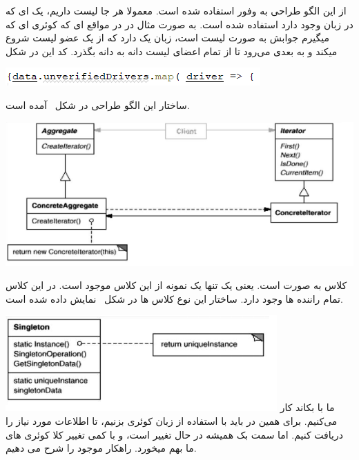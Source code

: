 

از این الگو طراحی به وفور استفاده شده است. معمولا هر جا لیست داریم، یک
 ای
 که در زبان وجود دارد استفاده شده است. به صورت مثال در
در مواقع ای که کوئری ای که میگیرم جوابش به صورت لیست است، زبان
یک 
 دارد که از یک عضو لیست شروع میکند و به بعدی می‌رود تا از تمام اعضای لیست دانه به دانه بگذرد. کد این
در شکل~

\centering
\includegraphics[width = 0.8 \linewidth]{../figs/patterns/iterator-code.png}

ساختار این الگو طراحی در  شکل~ آمده است.

\centering
\includegraphics[width = 0.8 \linewidth]{../figs/patterns/Iterator.png}

کلاس
به صورت
است. یعنی یک تنها یک نمونه از این کلاس موجود است. در این کلاس تمام راننده ها وجود دارد. ساختار این نوع کلاس ها در شکل~ نمایش داده شده است.

\centering
\includegraphics[width = 0.6 \linewidth]{../figs/patterns/Singleton.png}
ما با بکاند
کار می‌کنیم. برای همین در 
باید با استفاده از زبان 
 کوئری بزنیم، تا اطلاعات مورد نیاز را دریافت کنیم. اما سمت بک همیشه در حال تغییر است، و با کمی تغییر کلا کوئری های ما بهم میخورد. راهکار موجود را شرح می دهیم.


